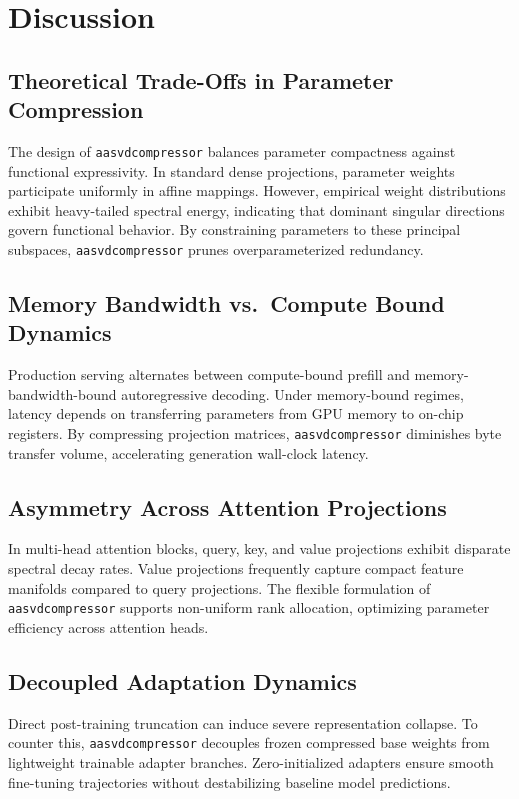 \section{Discussion}

\subsection{Theoretical Trade-Offs in Parameter Compression}
The design of \texttt{aasvdcompressor} balances parameter compactness against functional expressivity. In standard dense projections, parameter weights participate uniformly in affine mappings. However, empirical weight distributions exhibit heavy-tailed spectral energy, indicating that dominant singular directions govern functional behavior. By constraining parameters to these principal subspaces, \texttt{aasvdcompressor} prunes overparameterized redundancy.

\subsection{Memory Bandwidth vs.\ Compute Bound Dynamics}
Production serving alternates between compute-bound prefill and memory-bandwidth-bound autoregressive decoding. Under memory-bound regimes, latency depends on transferring parameters from GPU memory to on-chip registers. By compressing projection matrices, \texttt{aasvdcompressor} diminishes byte transfer volume, accelerating generation wall-clock latency.

\subsection{Asymmetry Across Attention Projections}
In multi-head attention blocks, query, key, and value projections exhibit disparate spectral decay rates. Value projections frequently capture compact feature manifolds compared to query projections. The flexible formulation of \texttt{aasvdcompressor} supports non-uniform rank allocation, optimizing parameter efficiency across attention heads.

\subsection{Decoupled Adaptation Dynamics}
Direct post-training truncation can induce severe representation collapse. To counter this, \texttt{aasvdcompressor} decouples frozen compressed base weights from lightweight trainable adapter branches. Zero-initialized adapters ensure smooth fine-tuning trajectories without destabilizing baseline model predictions.

